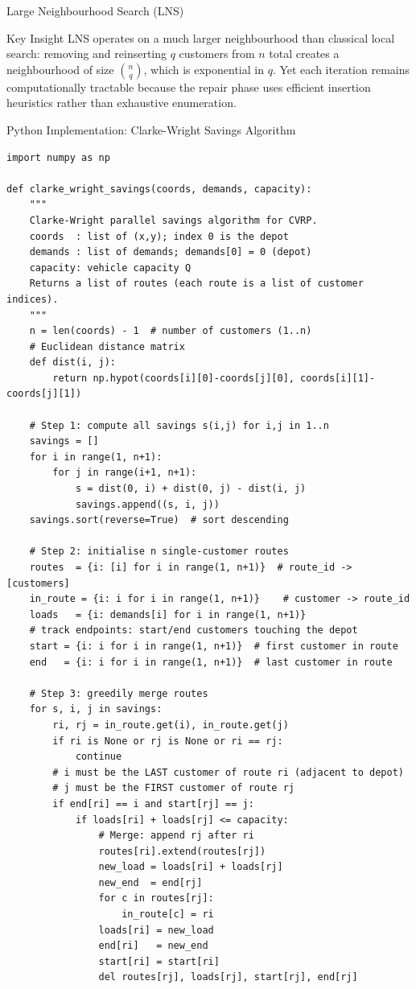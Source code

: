 \documentclass[aspectratio=169,10pt]{beamer}
\begin{document}
\begin{frame}[allowframebreaks]{Large Neighbourhood Search (LNS)}
  \begin{alertblock}{Key Insight}
    LNS operates on a much larger neighbourhood than classical local
    search: removing and reinserting $q$ customers from $n$ total
    creates a neighbourhood of size $\binom{n}{q}$, which is exponential
    in $q$.  Yet each iteration remains computationally tractable because
    the repair phase uses efficient insertion heuristics rather than
    exhaustive enumeration.
  \end{alertblock}

\end{frame}

\begin{frame}[fragile]{Python Implementation: Clarke-Wright Savings Algorithm}
\begin{lstlisting}
import numpy as np

def clarke_wright_savings(coords, demands, capacity):
    """
    Clarke-Wright parallel savings algorithm for CVRP.
    coords  : list of (x,y); index 0 is the depot
    demands : list of demands; demands[0] = 0 (depot)
    capacity: vehicle capacity Q
    Returns a list of routes (each route is a list of customer indices).
    """
    n = len(coords) - 1  # number of customers (1..n)
    # Euclidean distance matrix
    def dist(i, j):
        return np.hypot(coords[i][0]-coords[j][0], coords[i][1]-coords[j][1])

    # Step 1: compute all savings s(i,j) for i,j in 1..n
    savings = []
    for i in range(1, n+1):
        for j in range(i+1, n+1):
            s = dist(0, i) + dist(0, j) - dist(i, j)
            savings.append((s, i, j))
    savings.sort(reverse=True)  # sort descending

    # Step 2: initialise n single-customer routes
    routes  = {i: [i] for i in range(1, n+1)}  # route_id -> [customers]
    in_route = {i: i for i in range(1, n+1)}    # customer -> route_id
    loads   = {i: demands[i] for i in range(1, n+1)}
    # track endpoints: start/end customers touching the depot
    start = {i: i for i in range(1, n+1)}  # first customer in route
    end   = {i: i for i in range(1, n+1)}  # last customer in route

    # Step 3: greedily merge routes
    for s, i, j in savings:
        ri, rj = in_route.get(i), in_route.get(j)
        if ri is None or rj is None or ri == rj:
            continue
        # i must be the LAST customer of route ri (adjacent to depot)
        # j must be the FIRST customer of route rj
        if end[ri] == i and start[rj] == j:
            if loads[ri] + loads[rj] <= capacity:
                # Merge: append rj after ri
                routes[ri].extend(routes[rj])
                new_load = loads[ri] + loads[rj]
                new_end  = end[rj]
                for c in routes[rj]:
                    in_route[c] = ri
                loads[ri] = new_load
                end[ri]   = new_end
                start[ri] = start[ri]
                del routes[rj], loads[rj], start[rj], end[rj]


\end{lstlisting}
\end{frame}
\end{document}

